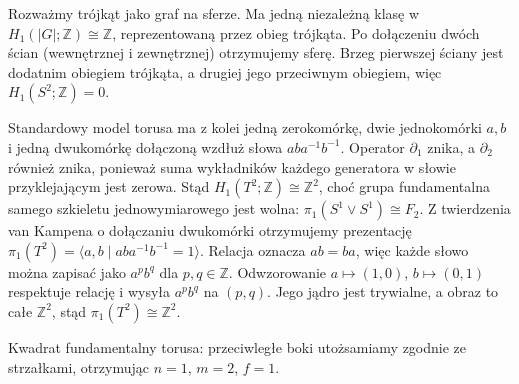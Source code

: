 \begin{przyklad}
Rozważmy trójkąt jako graf na sferze. Ma jedną niezależną
klasę w $H_1(|G|;\mathbb Z)\cong\mathbb Z$, reprezentowaną
przez obieg trójkąta. Po dołączeniu dwóch ścian
(wewnętrznej i zewnętrznej) otrzymujemy sferę.
Brzeg pierwszej ściany jest dodatnim obiegiem trójkąta,
a drugiej jego przeciwnym obiegiem, więc
$H_1(S^2;\mathbb Z)=0$.

Standardowy model torusa ma z kolei jedną zerokomórkę,
dwie jednokomórki $a,b$ i jedną dwukomórkę dołączoną
wzdłuż słowa $aba^{-1}b^{-1}$. Operator $\partial_1$ znika,
a $\partial_2$ również znika, ponieważ suma wykładników
każdego generatora w słowie przyklejającym jest zerowa.
Stąd $H_1(T^2;\mathbb Z)\cong\mathbb Z^2$, choć grupa
fundamentalna samego szkieletu jednowymiarowego jest
wolna: $\pi_1(S^1\vee S^1)\cong F_2$.
Z twierdzenia van Kampena o dołączaniu dwukomórki
otrzymujemy prezentację
$\pi_1(T^2)=\langle a,b\mid aba^{-1}b^{-1}=1\rangle$.
Relacja oznacza $ab=ba$, więc każde słowo można
zapisać jako $a^p b^q$ dla $p,q\in\mathbb Z$.
Odwzorowanie $a\mapsto(1,0)$, $b\mapsto(0,1)$
respektuje relację i wysyła $a^p b^q$ na $(p,q)$.
Jego jądro jest trywialne, a obraz to całe $\mathbb Z^2$,
stąd $\pi_1(T^2)\cong\mathbb Z^2$.
\end{przyklad}

\begin{center}

{\footnotesize Kwadrat fundamentalny torusa: przeciwległe boki
utożsamiamy zgodnie ze strzałkami, otrzymując $n=1$, $m=2$, $f=1$.}
\end{center}


